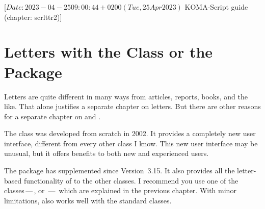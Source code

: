 %
%
%
%
%
%
%

%
                 [$Date: 2023-04-25 09:00:44 +0200 (Tue, 25 Apr 2023) $
                  KOMA-Script guide (chapter: scrlttr2)]


\chapter{Letters with the  Class or the 
  Package}

\BeginIndexGroup
{}%
%
Letters are quite different in many ways from articles, reports, books, and
the like. That alone justifies a separate chapter on letters. But there are
other reasons for a separate chapter on  and
.

The  class was developed from
scratch in 2002. It provides a completely new user interface, different from
every other class I know. This new user interface may be unusual, but it
offers benefits to both new and experienced {\KOMAScript} users.

The %
 package has supplemented \KOMAScript{}
since Version~3.15. It also provides all the letter-based functionality of
 to the other classes. I recommend you use one of the
\KOMAScript{} classes\,---\,,  or
\,---\, which are explained in the previous chapter. With
minor limitations,  also works well with the standard
classes.

